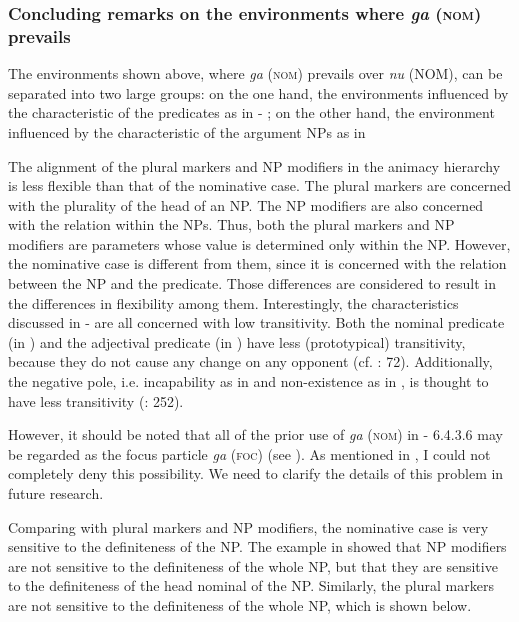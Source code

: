 \begin{table}
\begin{styleBeschriftung}
\subsubsection{Concluding remarks on the environments where \textit{ga} (\textsc{nom}) prevails}

The environments shown above, where \textit{ga} (\textsc{nom}) prevails over \textit{nu} (NOM), can be separated into two large groups: on the one hand, the environments influenced by the characteristic of the predicates as in  - ; on the other hand, the environment influenced by the characteristic of the argument NPs as in 

The alignment of the plural markers and NP modifiers in the animacy hierarchy is less flexible than that of the nominative case. The plural markers are concerned with the plurality of the head of an NP. The NP modifiers are also concerned with the relation within the NPs. Thus, both the plural markers and NP modifiers are parameters whose value is determined only within the NP. However, the nominative case is different from them, since it is concerned with the relation between the NP and the predicate. Those differences are considered to result in the differences in flexibility among them. Interestingly, the characteristics discussed in  -  are all concerned with low transitivity. Both the nominal predicate (in ) and the adjectival predicate (in ) have less (prototypical) transitivity, because they do not cause any change on any opponent (cf. \citealt{Tsunoda1991}: 72). Additionally, the negative pole, i.e. incapability as in  and non-existence as in , is thought to have less transitivity (\citealt{HopperThompson1980}: 252).

However, it should be noted that all of the prior use of \textit{ga} (\textsc{nom}) in  - 6.4.3.6 may be regarded as the focus particle \textit{ga} (\textsc{foc}) (see ). As mentioned in , I could not completely deny this possibility. We need to clarify the details of this problem in future research.

Comparing with plural markers and NP modifiers, the nominative case is very sensitive to the definiteness of the NP. The example  in  showed that NP modifiers are not sensitive to the definiteness of the whole NP, but that they are sensitive to the definiteness of the head nominal of the NP. Similarly, the plural markers are not sensitive to the definiteness of the whole NP, which is shown below.


\end{styleBeschriftung}
\end{table}
